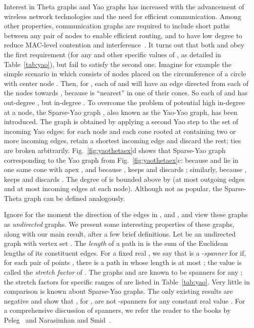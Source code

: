 \documentclass[11pt]{article}
\begin{document}
Interest in Theta graphs and Yao graphs has increased with the advancement of wireless network technologies and the need for efficient communication. Among other properties, communication graphs are required to include short paths between any pair of nodes to enable efficient routing, and to have low degree to reduce MAC-level contention and interference~\cite{DegreeMac06}. It turns out that both  and  obey the first requirement (for any  and other specific values of , as detailed in Table~\ref{tab:yao}), but fail to satisfy the second one. Imagine for example the simple scenario in which  consists of  nodes placed on the circumference of a circle with center node . Then, for , each of  and  will have an edge directed from each of the  nodes towards , because  is ``nearest'' in one of their cones. So each of  and  has out-degree , but in-degree . To overcome the problem of potential high in-degree at a node, the Sparse-Yao graph , also known as the Yao-Yao graph, has been introduced. The graph  is obtained by applying a second Yao step to the set of incoming Yao edges: for each node  and each cone rooted at  containing two or more incoming edges, retain a shortest incoming edge and discard the rest; ties are broken arbitrarily. Fig.~\ref{fig:yaothetaex}d shows that Sparse-Yao graph  corresponding to the Yao graph  from Fig.~\ref{fig:yaothetaex}c: because  and  lie in one same cone with apex , and because ,  keeps  and discards ; similarly, because ,  keeps  and discards .
The degree of  is bounded above by  (at most  outgoing edges and at most  incoming edges at each node). Although not as popular, the Sparse-Theta graph can be defined analogously.

Ignore for the moment the direction of the edges in ,  and , and view these graphs as \emph{undirected} graphs.
We present some interesting properties of these graphs, along with our main result, after a few brief definitions. Let  be an undirected graph with vertex set . The \emph{length} of a path in  is the sum of the Euclidean lengths of its constituent edges. For a fixed real , we say that  is a -\emph{spanner} for  if, for each pair of points , there is a path in  whose length is at most ; the value  is called the \emph{stretch factor} of . The graphs  and  are known to be spanners for any ; the stretch factors for specific ranges of  are listed in Table~\ref{tab:yao}. Very little in comparison is known about Sparse-Yao graphs. The only existing results are negative and show that , for , are not -spanners for any constant real value . For a comprehensive discussion of spanners, we refer the reader to the books by Peleg~\cite{Peleg00} and Narasimhan and Smid~\cite{ns-gsn-07}.
\end{document}
